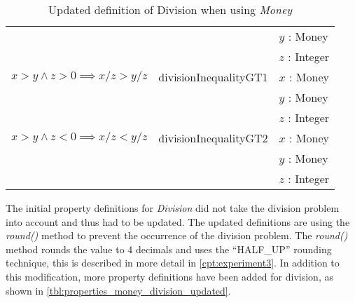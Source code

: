 \begin{table}[!ht]
\begin{tabular}{lll}
\rowcolor[HTML]{EFEFEF}                                               &                        & $y$ : Money              \\
\rowcolor[HTML]{EFEFEF}                                               &                        & $z$ : Integer            \\
												$x > y \land z > 0 \implies x / z > y / z$    & divisionInequalityGT1  & $x$ : Money              \\
                                                                      &                        & $y$ : Money              \\
                                                                      &                        & $z$ : Integer            \\
\rowcolor[HTML]{EFEFEF} $x > y \land z < 0 \implies x / z < y / z$    & divisionInequalityGT2  & $x$ : Money              \\
\rowcolor[HTML]{EFEFEF}                                               &                        & $y$ : Money              \\
\rowcolor[HTML]{EFEFEF}                                               &                        & $z$ : Integer            \\ \hline
\end{tabular}
\caption{Updated definition of Division when using \textit{Money}}
\label{tbl:properties_money_division_updated}
\end{table}
\FloatBarrier\noindent
The initial property definitions for \textit{Division} did not take the division
problem into account and thus had to be updated. The updated definitions are
using the \textit{round()} method to prevent the occurrence of the division
problem. The \textit{round()} method rounds the value to 4 decimals and uses the
``HALF\_UP'' rounding technique, this is described in more detail in \autoref{cpt:experiment3}.
In addition to this modification, more property
definitions have been added for division, as shown in
\autoref{tbl:properties_money_division_updated}.
\clearpage %

